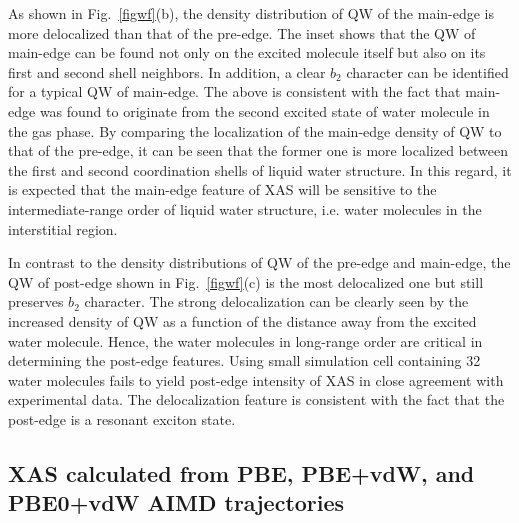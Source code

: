 \documentclass[prb,twocolumn,showpacs,preprintnumbers,superscriptaddress,amsmath,amssymb]{revtex4}
\begin{document}
As shown in Fig.~\ref{figwf}(b),
the density distribution of QW of the main-edge is more delocalized than that of the pre-edge.
The inset shows that the QW of main-edge can be found not only on the excited molecule itself but also on
its first and second shell neighbors.
In addition, a clear $b_2$ character can be identified for a typical QW of main-edge.
The above is consistent with the fact that main-edge was found to originate from the second excited state
of water molecule in the gas phase.
By comparing the localization of the main-edge density of QW
to that of the pre-edge, it can be seen that the former one is more localized between the first and second coordination shells of liquid water structure.
In this regard, it is expected that the main-edge feature of XAS will be sensitive to
the intermediate-range order of liquid
water structure, i.e. water molecules in the interstitial region.


In contrast to the density distributions of QW of the pre-edge and main-edge,
the QW of post-edge shown in Fig.~\ref{figwf}(c) is the most delocalized one but still preserves
$b_2$ character.
The strong delocalization can be clearly seen by the increased density of QW
as a function of the distance away from the excited water molecule.
Hence, the water molecules in long-range order
are critical in determining the post-edge features.
Using small simulation cell containing 32 water molecules fails to yield 
post-edge intensity of XAS in close agreement with experimental data.\cite{chen2010PRLxas}
The delocalization feature is consistent with the fact that the post-edge is a resonant exciton state.

\subsection{XAS calculated from PBE, PBE+vdW, and PBE0+vdW AIMD
trajectories}
\end{document}

